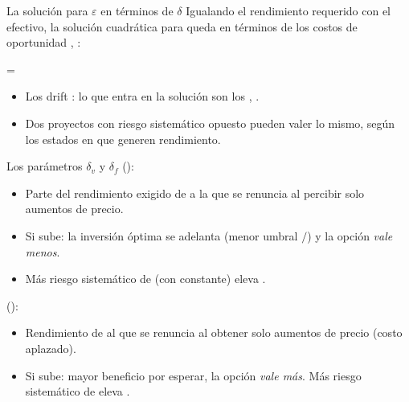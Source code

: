 \begin{frame}{La solución para $\varepsilon$ en términos de $\delta$}
  Igualando el rendimiento requerido con el efectivo, la solución cuadrática
  para \rj{$\varepsilon$} queda en términos de los costos de oportunidad
  , :
  \begin{ecmed}
    \rj{\varepsilon} = 
  \end{ecmed}
  \begin{itemize}
    \item Los drift \az{$\alpha$} : lo que
          entra en la solución son los 
          , .
    \item Dos proyectos con riesgo sistemático opuesto pueden valer lo mismo,
          según los estados en que generen rendimiento.
  \end{itemize}
\end{frame}

\begin{frame}{Los parámetros $\delta_v$ y $\delta_f$}
   ():
  \begin{itemize}
    \item Parte del rendimiento exigido de  a la que se renuncia al
          percibir solo aumentos de precio.
    \item Si  sube: la inversión óptima se adelanta (menor
          umbral $/$) y la opción \emph{vale menos}.
    \item Más riesgo sistemático de  (con  constante)
          eleva .
  \end{itemize}
  \par\vspace{2mm}
   ():
  \begin{itemize}
    \item Rendimiento de  al que se renuncia al obtener solo aumentos
          de precio (costo aplazado).
    \item Si  sube: mayor beneficio por esperar, la opción
          \emph{vale más}. Más riesgo sistemático de  eleva
          .
  \end{itemize}
\end{frame}

